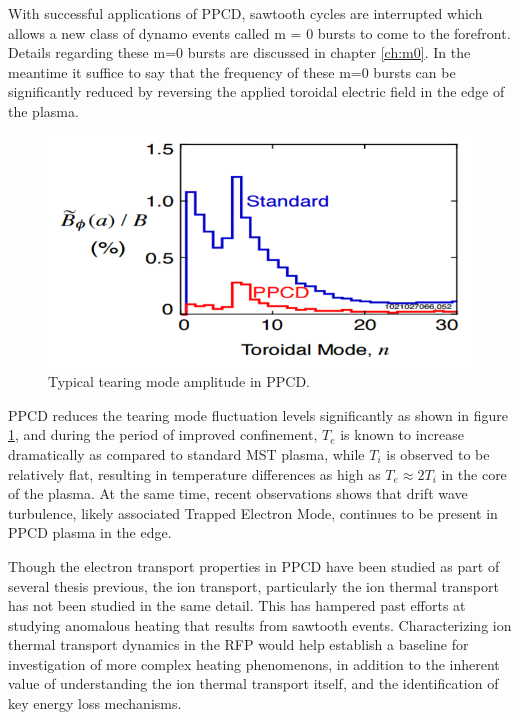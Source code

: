 \begin{refsection}
With successful applications of PPCD, sawtooth cycles are interrupted which allows a new class of dynamo events called m = 0 bursts to come to the forefront. Details regarding these m=0 bursts are discussed in chapter \ref{ch:m0}. In the meantime it suffice to say that the frequency of these m=0 bursts can be significantly reduced by reversing the applied toroidal electric field in the edge of the plasma\cite{Chapman2001}.

\begin{figure}
    \centering
    \includegraphics{./1_Introduction/ppcd_fluc.png}
    \caption[Typical tearing mode amplitude in PPCD]{Typical tearing mode amplitude in PPCD.}
    \label{fig:ppcd_fluc}
\end{figure}

PPCD reduces the tearing mode fluctuation levels significantly as shown in figure \ref{fig:ppcd_fluc}, and during the period of improved confinement, $T_e$ is known to increase dramatically as compared to standard MST plasma, while $T_i$ is observed to be relatively flat, resulting in temperature differences as high as $T_e \approx 2T_i$ in the core of the plasma. At the same time, recent observations shows that drift wave turbulence, likely associated Trapped Electron Mode, continues to be present in PPCD plasma in the edge. 

Though the electron transport properties in PPCD have been studied as part of several thesis previous, the ion transport, particularly the ion thermal transport has not been studied in the same detail. This has hampered past efforts at studying anomalous heating that results from sawtooth events. Characterizing ion thermal transport dynamics in the RFP would help establish a baseline for investigation of more complex heating phenomenons, in addition to the inherent value of understanding the ion thermal transport itself, and the identification of key energy loss mechanisms.


\end{refsection}

